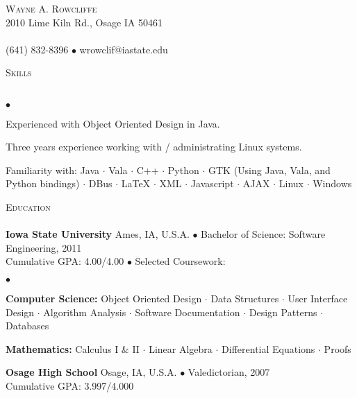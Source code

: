 \documentclass{article}
\newcommand{\lineunder} {
	\vspace*{-8pt} \\ \hspace*{-18pt} \hrulefill \\
}
\newcommand{\header}[1] {
	{\hspace*{-15pt}\vspace*{6pt} \textsc{#1}} \vspace*{-6pt} \lineunder
}
\newcommand{\contact}[3] {
	\vspace*{-8pt}\begin{center}{\LARGE \scshape {#1}}\\#2 \lineunder#3\end{center}\vspace*{-8pt}
}
\newenvironment{achievements} {
	\begin{list}{$\bullet$}
		{\topsep 0pt \itemsep -2pt}
	}{
		\vspace*{4pt}\end{list}
	}
\newcommand{\schoolwithcourses}[4]{
	\textbf{#1} #2 $\bullet$ #3\\
	#4 $\bullet$  Selected Coursework:\\
	\vspace*{5pt}
}
\newcommand{\school}[4] {
	\textbf{#1} #2 $\bullet$ #3\\
	#4 \\
}
\newcommand{\area}[1] {\textbf{#1:}}
\newcommand{\subject}[1] {#1 $\cdot$}
\newcommand{\lastsubject}[1] {#1}
\begin{document}
\small
\smallskip
\vspace*{-44pt}

\contact{Wayne A. Rowcliffe}
{2010 Lime Kiln Rd., Osage IA 50461}
{(641) 832-8396 $\bullet$ wrowclif@iastate.edu}%

\header{Skills}

	\begin{achievements}
		\item{Experienced with Object Oriented Design in Java.}
		\item{Three years experience working with / administrating Linux systems.}
		\item{Familiarity with:
			\subject{Java}
			\subject{Vala}
			\subject{C++}
			\subject{Python}
			\subject{GTK (Using Java, Vala, and Python bindings)}
			\subject{DBus}
			\subject{\LaTeX{}}
			\subject{XML}
			\subject{Javascript}
			\subject{AJAX}
			\subject{Linux}
			\lastsubject{Windows}
		}

	\end{achievements}

\header{Education}

	\schoolwithcourses{Iowa State University}{Ames, IA, U.S.A.}{Bachelor of Science: Software Engineering, 2011}
	{Cumulative GPA: 4.00/4.00}
		\begin{achievements}
			\item{
				\area{Computer Science}
				\subject{Object Oriented Design}
				\subject{Data Structures}
				\subject{User Interface Design}
				\subject{Algorithm Analysis}
				\subject{Software Documentation}
				\subject{Design Patterns}
				\lastsubject{Databases}
			}
			\item{
				\area{Mathematics}
				\subject{Calculus I \& II}
				\subject{Linear Algebra}
				\subject{Differential Equations}
				\lastsubject{Proofs}
			}
		\end{achievements}

	\school{Osage High School}{Osage, IA, U.S.A.}{Valedictorian, 2007}
	{Cumulative GPA: 3.997/4.000}
\end{document}
